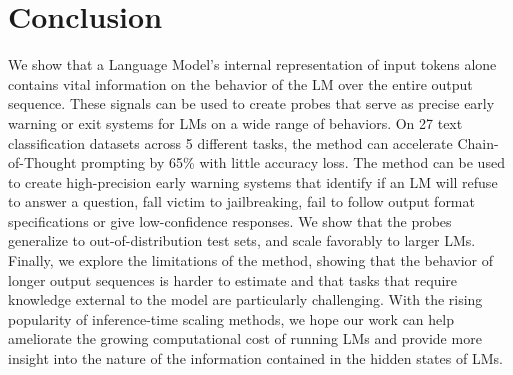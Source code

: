 \section{Conclusion}
\label{sec:conclusion}
We show that a Language Model's internal representation of input tokens alone contains vital information on the behavior of the LM over the entire output sequence. These signals can be used to create probes that serve as precise early warning or exit systems for LMs on a wide range of behaviors. On 27 text classification datasets across 5 different tasks, the method can accelerate Chain-of-Thought prompting by 65\% with little accuracy loss. The method can be used to create high-precision early warning systems that identify if an LM will refuse to answer a question, fall victim to jailbreaking, fail to follow output format specifications or give low-confidence responses. We show that the probes generalize to out-of-distribution test sets, and scale favorably to larger LMs. Finally, we explore the limitations of the method, showing that the behavior of longer output sequences is harder to estimate and that tasks that require knowledge external to the model are particularly challenging. With the rising popularity of inference-time scaling methods, we hope our work can help ameliorate the growing computational cost of running LMs and provide more insight into the nature of the information contained in the hidden states of LMs.  